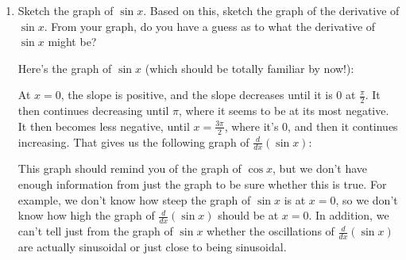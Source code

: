 \documentclass[main]{subfiles}
\begin{document}
\begin{enumerate}
\item 

  \begin{problem}[\stretch{2}]
    Sketch the graph of $\sin x$.  Based on this, sketch the graph of the
    derivative of $\sin x$.  From your graph, do you have a guess as to
    what the derivative of $\sin x$ might be?
  \end{problem}

  \begin{solution}
    Here's the graph of $\sin x$ (which should be totally familiar by
    now!): 
    \begin{center}
    \end{center}
    At $x = 0$, the slope is positive, and the slope decreases until it is
    0 at $\frac{\pi}{2}$.  It then continues decreasing until $\pi$, where
    it seems to be at its most negative.  It then becomes less negative,
    until $x = \frac{3 \pi}{2}$, where it's 0, and then it continues
    increasing.  That gives us the following graph of $\frac{d}{dx} (\sin
    x)$:
    \begin{center}
    \end{center}
    This graph should remind you of the graph of $\cos x$, but we don't
    have enough information from just the graph to be sure whether this is
    true.  For example, we don't know how steep the graph of $\sin x$ is
    at $x = 0$, so we don't know how high the graph of $\frac{d}{dx} (\sin
    x)$ should be at $x = 0$.  In addition, we can't tell just from the
    graph of $\sin x$ whether the oscillations of $\frac{d}{dx} (\sin x)$
    are actually sinusoidal or just close to being sinusoidal.
  \end{solution}


\end{enumerate}
\end{document}
